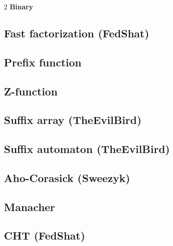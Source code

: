 \documentclass[a4paper]{article}
\begin{document}
\begin{multicols*}{2}
            \textbf{Binary}
            
        
        \subsection{Fast factorization (FedShat)}
            

        \subsection{Prefix function}
            
            
        \subsection{Z-function}
            
            
        \subsection{Suffix array (TheEvilBird)}
            
            
        \subsection{Suffix automaton (TheEvilBird)}
            
        
        \subsection{Aho-Corasick (Sweezyk)}
            
            
        \subsection{Manacher}
            
            
        \subsection{CHT (FedShat)}
            


\end{multicols*}
\end{document}
